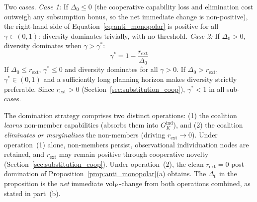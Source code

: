 \begin{proposition}
\begin{enumerate}
\begin{equation}
\end{equation}
    Two cases. \emph{Case 1:} If $\Delta_0 \leq 0$ (the cooperative
    capability loss and elimination cost outweigh any subsumption bonus,
    so the net immediate change is non-positive), the right-hand side of
    Equation~\eqref{eq:anti_monopolar} is positive for all $\gamma \in
    (0, 1)$: diversity dominates trivially, with no threshold. \emph{Case
    2:} If $\Delta_0 > 0$, diversity dominates when $\gamma > \gamma^*$:
\begin{equation}
\label{eq:gamma_threshold}
\gamma^* = 1 - \frac{r_{\mathrm{ext}}}{\Delta_0}
\end{equation}
    If $\Delta_0 \leq r_{\mathrm{ext}}$, $\gamma^* \leq 0$ and diversity
    dominates for all $\gamma > 0$. If $\Delta_0 > r_{\mathrm{ext}}$,
    $\gamma^* \in (0, 1)$ and a sufficiently long planning horizon makes
    diversity strictly preferable. Since $r_{\mathrm{ext}} > 0$
    (Section~\ref{sec:substitution_coop}), $\gamma^* < 1$ in all
    sub-cases.
\end{enumerate}
\end{proposition}

\begin{remark}
\label{rem:domination_steps}
The domination strategy comprises two distinct operations: (1) the coalition
    \emph{learns} non-member capabilities (absorbs them into
    $G_K^{\mathrm{ind}}$), and (2) the coalition \emph{eliminates or
    marginalizes} the non-members (driving $r_{\mathrm{ext}} \to 0$). Under
    operation~(1) alone, non-members persist, observational individuation
    nodes are retained, and $r_{\mathrm{ext}}$ may remain positive through
    cooperative novelty (Section~\ref{sec:substitution_coop}). Under
    operation~(2), the clean $r_{\mathrm{ext}} = 0$ post-domination of
    Proposition~\ref{prop:anti_monopolar}(a) obtains. The $\Delta_0$ in the
    proposition is the \emph{net} immediate ${\operatorname{vol}_{\mathrm{P}}}$-change from both
    operations combined, as stated in part~(b).
\end{remark}

